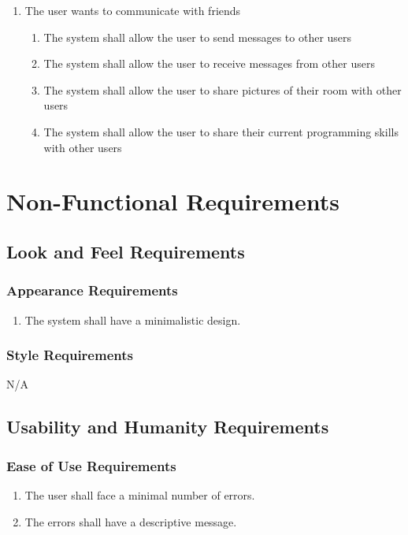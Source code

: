 \documentclass[]{article}
\begin{document}
\begin{enumerate}[start=1, label={\textbf{BE\arabic*.}}]
    \item The user wants to communicate with friends
	\begin{enumerate}[1.]
        \item The system shall allow the user to send messages to other users
        \item The system shall allow the user to receive messages from other users
        \item The system shall allow the user to share pictures of their room 
        with other users
        \item The system shall allow the user to share their current programming 
        skills with other users               
    \end{enumerate}
\end{enumerate}

\section{Non-Functional Requirements}
\label{sec:non-functional_requirements}

\subsection{Look and Feel Requirements}
\label{sub:look_and_feel_requirements}

\subsubsection{Appearance Requirements}
\label{ssub:appearance_requirements}
\begin{enumerate}[start=1, label={LF\arabic*.}]
	\item The system shall have a minimalistic design.
\end{enumerate}

\subsubsection{Style Requirements}
\label{ssub:style_requirements}
N/A

\subsection{Usability and Humanity Requirements}
\label{sub:usability_and_humanity_requirements}

\subsubsection{Ease of Use Requirements}
\label{ssub:ease_of_use_requirements}
\begin{enumerate}[start=1, label={UH\arabic*.}]
	\item The user shall face a minimal number of errors. 
	\item The errors shall have a descriptive message.
\end{enumerate}
\end{document}

